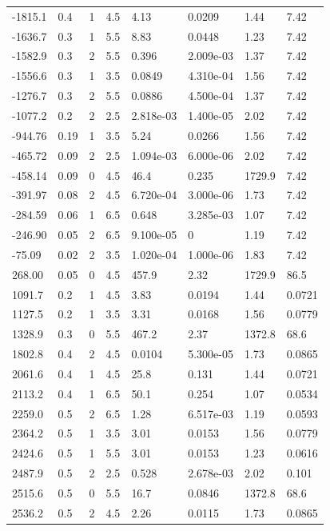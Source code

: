 \documentclass[preview]{standalone}
\begin{document}
{{\begin{tabular}{L{1.2cm}C{1.2cm} C{0.3cm}C{0.5cm} C{1.4cm}C{1.4cm} C{1.4cm}C{1.4cm}}
  -1815.1  &   0.4  & 1     & 4.5 &  4.13  & 0.0209  & 1.44 &  7.42   \\ 
  -1636.7  &   0.3  & 1     & 5.5 &  8.83  & 0.0448  & 1.23 &  7.42   \\ 
  -1582.9  &   0.3  & 2     & 5.5 &  0.396  & 2.009e-03  & 1.37 &  7.42   \\ 
  -1556.6  &   0.3  & 1     & 3.5 &  0.0849  & 4.310e-04  & 1.56 &  7.42   \\ 
  -1276.7  &   0.3  & 2     & 5.5 &  0.0886  & 4.500e-04  & 1.37 &  7.42   \\ 
  -1077.2  &   0.2  & 2     & 2.5 &  2.818e-03  & 1.400e-05  & 2.02 &  7.42   \\ 
  -944.76  &  0.19  & 1     & 3.5 &  5.24  & 0.0266  & 1.56 &  7.42   \\ 
  -465.72  &  0.09  & 2     & 2.5 &  1.094e-03  & 6.000e-06  & 2.02 &  7.42   \\ 
  -458.14  &  0.09  & 0     & 4.5 &  46.4  & 0.235  & 1729.9 &  7.42   \\ 
  -391.97  &  0.08  & 2     & 4.5 &  6.720e-04  & 3.000e-06  & 1.73 &  7.42   \\ 
  -284.59  &  0.06  & 1     & 6.5 &  0.648  & 3.285e-03  & 1.07 &  7.42   \\ 
  -246.90  &  0.05  & 2     & 6.5 &  9.100e-05  & 0  & 1.19 &  7.42   \\ 
  -75.09  &  0.02  & 2     & 3.5 &  1.020e-04  & 1.000e-06  & 1.83 &  7.42   \\ 
  268.00  &  0.05  & 0     & 4.5 &  457.9  & 2.32  & 1729.9 &  86.5   \\ 
  1091.7  &   0.2  & 1     & 4.5 &  3.83  & 0.0194  & 1.44 &  0.0721   \\ 
  1127.5  &   0.2  & 1     & 3.5 &  3.31  & 0.0168  & 1.56 &  0.0779   \\ 
  1328.9  &   0.3  & 0     & 5.5 &  467.2  & 2.37  & 1372.8 &  68.6   \\ 
  1802.8  &   0.4  & 2     & 4.5 &  0.0104  & 5.300e-05  & 1.73 &  0.0865   \\ 
  2061.6  &   0.4  & 1     & 4.5 &  25.8  & 0.131  & 1.44 &  0.0721   \\ 
  2113.2  &   0.4  & 1     & 6.5 &  50.1  & 0.254  & 1.07 &  0.0534   \\ 
  2259.0  &   0.5  & 2     & 6.5 &  1.28  & 6.517e-03  & 1.19 &  0.0593   \\ 
  2364.2  &   0.5  & 1     & 3.5 &  3.01  & 0.0153  & 1.56 &  0.0779   \\ 
  2424.6  &   0.5  & 1     & 5.5 &  3.01  & 0.0153  & 1.23 &  0.0616   \\ 
  2487.9  &   0.5  & 2     & 2.5 &  0.528  & 2.678e-03  & 2.02 &  0.101   \\ 
  2515.6  &   0.5  & 0     & 5.5 &  16.7  & 0.0846  & 1372.8 &  68.6   \\ 
  2536.2  &   0.5  & 2     & 4.5 &  2.26  & 0.0115  & 1.73 &  0.0865   \\ 
\hline 
\end{tabular} 

}}
\end{document}
